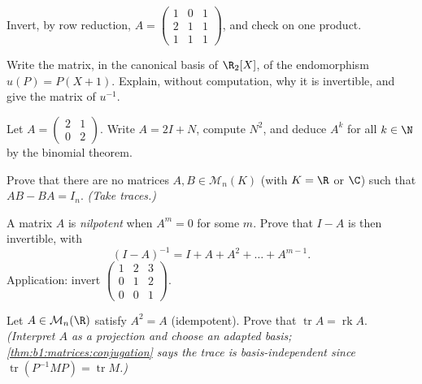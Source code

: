 \begin{exercise}[$\star$]\label{exo:b1:matrices:3}
Invert, by row reduction, $A = \begin{pmatrix} 1 & 0 & 1\\ 2 & 1 &
1\\ 1 & 1 & 1 \end{pmatrix}$, and check on one product.
\end{exercise}

\begin{exercise}[$\star$]\label{exo:b1:matrices:4}
Write the matrix, in the canonical basis of $\R_2[X]$, of the
endomorphism $u(P) = P(X + 1)$. Explain, without computation, why
it is invertible, and give the matrix of $u^{-1}$.
\end{exercise}

\begin{exercise}[$\star\star$]\label{exo:b1:matrices:5}
Let $A = \begin{pmatrix} 2 & 1 \\ 0 & 2\end{pmatrix}$. Write $A =
2I + N$, compute $N^2$, and deduce $A^k$ for all $k \in \N$ by the
binomial theorem.
\end{exercise}

\begin{exercise}[$\star\star$]\label{exo:b1:matrices:6}
Prove that there are no matrices $A, B \in \mathcal{M}_n(K)$ (with
$K = \R$ or $\C$) such that $AB - BA = I_n$. \emph{(Take traces.)}
\end{exercise}

\begin{exercise}[$\star\star$]\label{exo:b1:matrices:7}
A matrix $A$ is \emph{nilpotent} when $A^m = 0$ for some $m$. Prove
that $I - A$ is then invertible, with
\[
(I - A)^{-1} = I + A + A^2 + \dots + A^{m-1} .
\]
Application: invert $\begin{pmatrix} 1 & 2 & 3\\ 0 & 1 & 2\\ 0 & 0 &
1\end{pmatrix}$.
\end{exercise}

\begin{exercise}[$\star\star$]\label{exo:b1:matrices:8}
Let $A \in \mathcal{M}_n(\R)$ satisfy $A^2 = A$ (idempotent). Prove
that $\operatorname{tr} A = \operatorname{rk} A$. \emph{(Interpret
$A$ as a projection and choose an adapted basis;
\cref{thm:b1:matrices:conjugation} says the trace is
basis-independent since $\operatorname{tr}(P^{-1}MP) =
\operatorname{tr} M$.)}
\end{exercise}

